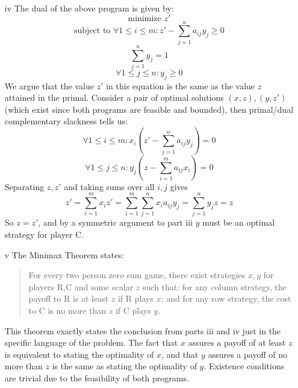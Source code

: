 \documentclass{article}
\begin{document}
\begin{itemize}
\item[iv] The dual of the above program is given by:
\[ \textrm{minimize } z' \]
\[ \textrm{subject to } \forall 1 \leq i \leq m : z' - \sum  \limits_{j=1}^n a_{ij} y_j \geq 0 \]
\[ \sum \limits_{j=1}^n y_j = 1 \]
\[ \forall 1 \leq j \leq n : y_j \geq 0 \]
We argue that the value $z'$ in this equation is the same as the value $z$ attained in the primal.  Consider a pair of optimal solutions $(x,z), (y,z')$ (which exist since both programs are feasible and bounded), then primal/dual complementary slackness tells us:
\[ \forall 1 \leq i \leq m : x_i(z' - \sum \limits_{j=1}^n a_{ij} y_j) = 0 \]
\[ \forall 1 \leq j \leq n : y_j(z - \sum \limits_{i=1}^m a_{ij} x_i) = 0 \]
Separating $z,z'$ and taking sums over all $i,j$ gives
\[ z' = \sum \limits_{i=1}^m x_i z' = \sum \limits_{i=1}^m  \sum \limits_{j=1}^n x_i a_{ij} y_j = \sum \limits_{j=1}^n y_j z = z \]
So $z = z'$, and by a symmetric argument to part iii $y$ must be an optimal strategy for player C.

\item[v] The Minimax Theorem states:
\begin{quote}
For every two person zero sum game, there exist strategies $x,y$ for players R,C and some scalar $z$ such that: for any column strategy, the payoff to R is at least $z$ if R plays $x$; and for any row strategy, the cost to C is no more than $z$ if C plays $y$.
\end{quote}

This theorem exactly states the conclusion from parts iii and iv just in the specific language of the problem.  The fact that $x$ assures a payoff of at least $z$ is equivalent to stating the optimality of $x$, and that $y$ assures a payoff of no more than $z$ is the same as stating the optimality of $y$.  Existence conditions are trivial due to the feasibility of both programs.

\end{itemize}
\end{document}
